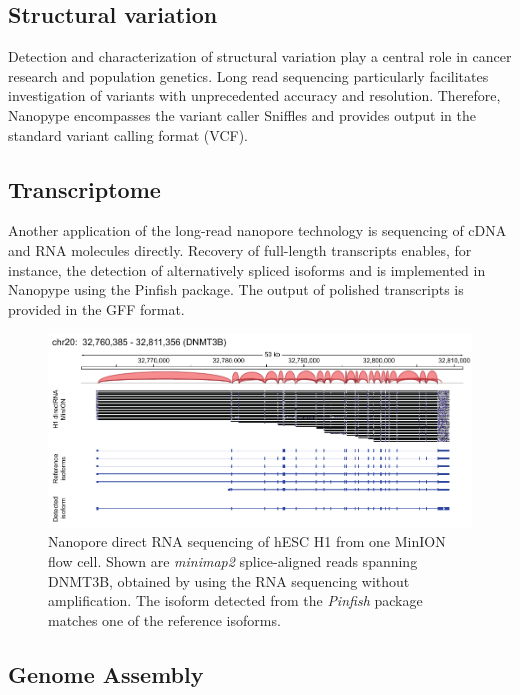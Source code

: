 \subsection{Structural variation}
\label{subsec:nanopype:sv}
Detection and characterization of structural variation play a central role in cancer research and population genetics. Long read sequencing particularly facilitates investigation of variants with unprecedented accuracy and resolution. Therefore, Nanopype encompasses the variant caller Sniffles \cite{Sedlazeck2018} and provides output in the standard variant calling format (VCF).


\subsection{Transcriptome}
\label{subsec:nanopype:transcriptom}
Another application of the long-read nanopore technology is sequencing of cDNA and RNA molecules directly. Recovery of full-length transcripts enables, for instance, the detection of alternatively spliced isoforms and is implemented in Nanopype using the Pinfish package. The output of polished transcripts is provided in the GFF format.

\begin{figure}[h]
	\centering
	\includegraphics[width=1.0\textwidth]{figures/nanopype/rna_isoforms.pdf}
	\captionsetup{format=plain}
	\caption[Nanopore direct RNA sequencing]{Nanopore direct RNA sequencing of hESC H1 from one MinION flow cell. Shown are \textit{minimap2} splice-aligned reads spanning DNMT3B, obtained by using the RNA sequencing without amplification. The isoform detected from the \textit{Pinfish} package matches one of the reference isoforms.}
	\label{fig:nanopype:rna_isoforms}
\end{figure}


\subsection{Genome Assembly}
\label{subsec:nanopype:assembly}




